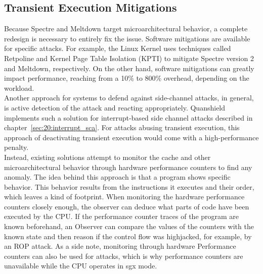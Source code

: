 \subsection{Transient Execution Mitigations}
\label{sec:20:def_sca}
Because Spectre and Meltdown target microarchitectural behavior, a complete
redesign is necessary to entirely fix the issue. Software mitigations are
available for specific attacks. For example, the Linux Kernel uses techniques
called Retpoline and Kernel Page Table Isolation (KPTI) to mitigate Spectre
version 2 and Meltdown, respectively.\cite{retpoline} On the other hand,
software mitigations can greatly impact performance, reaching from a 10\% to
800\% overhead, depending on the workload.\cite{low2018overview}\\

Another approach for systems to defend against side-channel attacks, in general,
is active detection of the attack and reacting appropriately. Quanshield
implements such a solution for interrupt-based side channel attacks described in
chapter~\ref{sec:20:interrupt_sca}. For attacks abusing transient execution,
this approach of deactivating transient execution would come with a
high-performance penalty.\\

Instead, existing solutions attempt to monitor the cache and other
microarchitectural behavior through hardware performance counters to find any
anomaly. The idea behind this approach is that a program shows specific
behavior. This behavior results from the instructions it executes and their
order, which leaves a kind of footprint. When monitoring the hardware
performance counters closely enough, the observer can deduce what parts of code
have been executed by the CPU. If the performance counter traces of the program
are known beforehand, an Observer can compare the values of the counters with
the known state and then reason if the control flow was highjacked, for example,
by an ROP attack. As a side note, monitoring through hardware Performance
counters can also be used for attacks, which is why performance counters are
unavailable while the CPU operates in \gls{sgx} mode.
\cite{uhsadel2008exploiting,costan2016intel}

